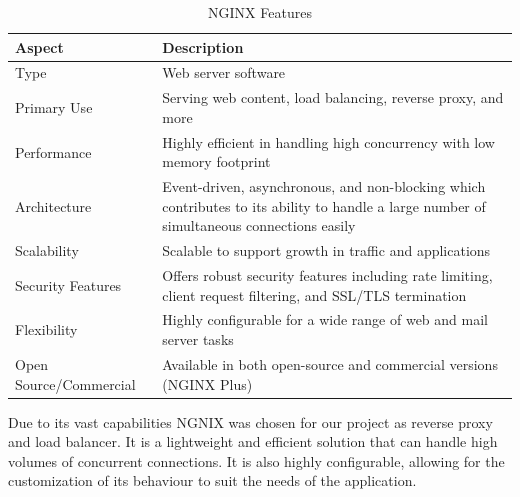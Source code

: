 \begin{table}[H]
    \centering
    \begin{tabularx}{\textwidth}{|l|X|}
        \hline
        \textbf{Aspect}        & \textbf{Description}                                                                                                                      \\
        \hline
        Type                   & Web server software                                                                                                                       \\
        \hline
        Primary Use            & Serving web content, load balancing, reverse proxy, and more                                                                              \\
        \hline
        Performance            & Highly efficient in handling high concurrency with low memory footprint                                                                   \\
        \hline
        Architecture           & Event-driven, asynchronous, and non-blocking which contributes to its ability to handle a large number of simultaneous connections easily \\
        \hline
        Scalability            & Scalable to support growth in traffic and applications                                                                                    \\
        \hline
        Security Features      & Offers robust security features including rate limiting, client request filtering, and SSL/TLS termination                                \\
        \hline
        Flexibility            & Highly configurable for a wide range of web and mail server tasks                                                                         \\
        \hline
        Open Source/Commercial & Available in both open-source and commercial versions (NGINX Plus)                                                                        \\
        \hline
    \end{tabularx}
    \label{tab:ngnix}
    \caption{NGINX Features}
\end{table}

Due to its vast capabilities NGNIX was chosen for our project as reverse proxy and load balancer. It is a lightweight and efficient solution that can handle high volumes of concurrent connections. It is also highly configurable, allowing for the customization of its behaviour to suit the needs of the application.

